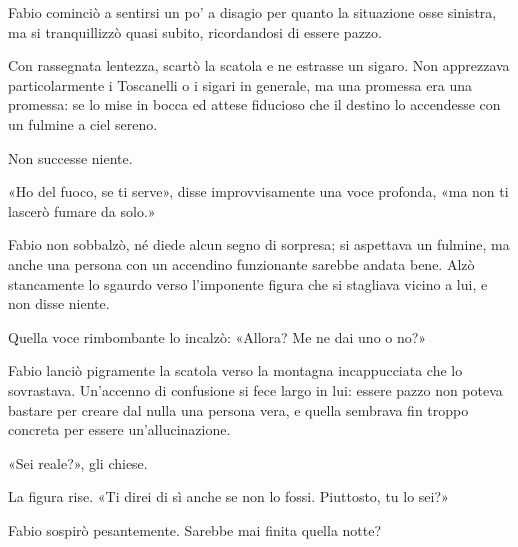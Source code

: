 Fabio cominciò a sentirsi un po' a disagio per quanto la situazione osse sinistra, ma si tranquillizzò quasi subito, ricordandosi di essere pazzo.

Con rassegnata lentezza, scartò la scatola e ne estrasse un sigaro. Non apprezzava particolarmente i Toscanelli o i sigari in generale, ma una promessa era una promessa: se lo mise in bocca ed attese fiducioso che il destino lo accendesse con un fulmine a ciel sereno.

Non successe niente.

«Ho del fuoco, se ti serve», disse improvvisamente una voce profonda, «ma non ti lascerò fumare da solo.»

Fabio non sobbalzò, né diede alcun segno di sorpresa; si aspettava un fulmine, ma anche una persona con un accendino funzionante sarebbe andata bene. Alzò stancamente lo sgaurdo verso l'imponente figura che si stagliava vicino a lui, e non disse niente.

Quella voce rimbombante lo incalzò: «Allora? Me ne dai uno o no?»

Fabio lanciò pigramente la scatola verso la montagna incappucciata che lo sovrastava. Un'accenno di confusione si fece largo in lui: essere pazzo non poteva bastare per creare dal nulla una persona vera, e quella sembrava fin troppo concreta per essere un'allucinazione.

«Sei reale?», gli chiese.

La figura rise. «Ti direi di sì anche se non lo fossi. Piuttosto, tu lo sei?»

Fabio sospirò pesantemente. Sarebbe mai finita quella notte?
